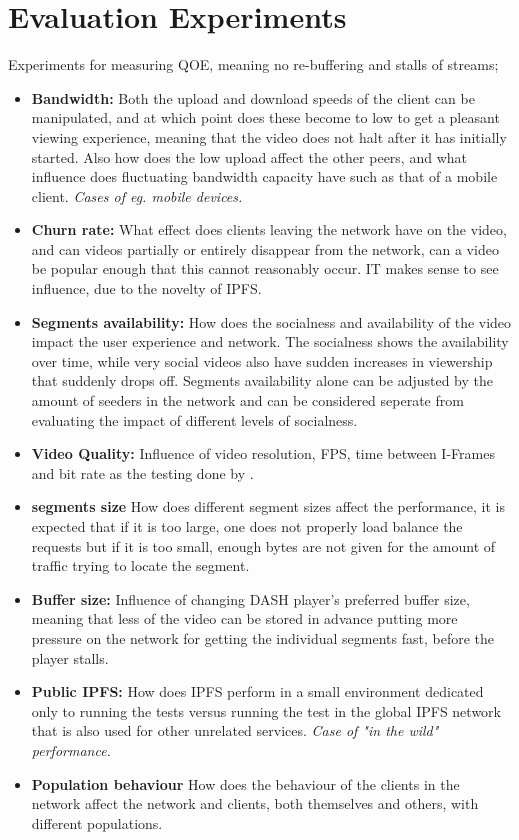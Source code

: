 \section{Evaluation Experiments}
Experiments for measuring \ac{QOE}, meaning no re-buffering and stalls of streams;
\begin{itemize}
    \item \textbf{Bandwidth:}
    Both the upload and download speeds of the client can be manipulated, and at which point does these become to low to get a pleasant viewing experience, meaning that the video does not halt after it has initially started. Also how does the low upload affect the other peers, and what influence does fluctuating bandwidth capacity have such as that of a mobile client.
    \textit{Cases of eg. mobile devices.}
    \item \textbf{Churn rate:}
    What effect does clients leaving the network have on the video, and can videos partially or entirely disappear from the network, can a video be popular enough that this cannot reasonably occur. IT makes sense to see influence, due to the novelty of IPFS.
    \item \textbf{Segments availability:}
    How does the socialness and availability of the video impact the user experience and network. The socialness shows the availability over time, while very social videos also have sudden increases in viewership that suddenly drops off. Segments availability alone can be adjusted by the amount of seeders in the network and can be considered seperate from evaluating the impact of different levels of socialness.
    \item \textbf{Video Quality:}
    Influence of video resolution, \acs{FPS}, time between I-Frames and bit rate as the testing done by \citeauthor{aloman2015performance}.
    \item \textbf{segments size}
    How does different segment sizes affect the performance, it is expected that if it is too large, one does not properly load balance the requests but if it is too small, enough bytes are not given for the amount of traffic trying to locate the segment.
    \item \textbf{Buffer size:}
    Influence of changing \acs{DASH} player's preferred buffer size, meaning that less of the video can be stored in advance putting more pressure on the network for getting the individual segments fast, before the player stalls. %
    \item \textbf{Public IPFS:}
    How does IPFS perform in a small environment dedicated only to running the tests versus running the test in the global IPFS network that is also used for other unrelated services.
    \textit{Case of "in the wild" performance.} 
    \item \textbf{Population behaviour}
    How does the behaviour of the clients in the network affect the network and clients, both themselves and others, with different populations.
\end{itemize}
